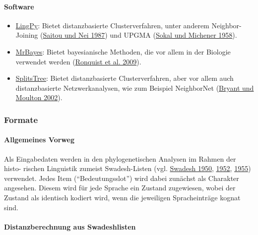 \paragraph{Software}

\begin{itemize}
\itemsep1pt\parskip0pt
\item
  \href{http://lingpy.org}{LingPy}: Bietet distanzbasierte
  Clusterverfahren, unter anderem Neighbor-Joining
  (\href{http://bibliography.lingpy.org?key=Saitou1987}{Saitou und Nei
  1987}) und UPGMA
  (\href{http://bibliography.lingpy.org?key=Sokal1958}{Sokal und
  Michener 1958}).
\item
  \href{http://mrbayes.sourceforge.net}{MrBayes}: Bietet bayesianische
  Methoden, die vor allem in der Biologie verwendet werden
  (\href{http://bibliography.lingpy.org?key=Ronquist2009}{Ronquist et
  al. 2009}).
\item
  \href{http://splitstree.org}{SplitsTree}: Bietet distanzbasierte
  Clusterverfahren, aber vor allem auch distanzbasierte
  Netzwerkanalysen, wie zum Beispiel NeighborNet
  (\href{http://bibliography.lingpy.org?key=Bryant2002}{Bryant und
  Moulton 2002}).
\end{itemize}



\subsubsection{Formate}

\paragraph{Allgemeines Vorweg}

Als Eingabedaten werden in den phylogenetischen Analysen im Rahmen der
histo- rischen Linguistik zumeist Swadesh-Listen (vgl.
\href{http://bibliography.lingpy.org?key=Swadesh1950}{Swadesh 1950},
\href{http://bibliography.lingpy.org?key=Swadesh1952}{1952},
\href{http://bibliography.lingpy.org?key=Swadesh1955}{1955}) verwendet.
Jedes Item (``Bedeutungsslot'') wird dabei zunächst als Charakter
angesehen. Diesem wird für jede Sprache ein Zustand zugewiesen, wobei
der Zustand als identisch kodiert wird, wenn die jeweiligen
Spracheinträge kognat sind.





\paragraph{Distanzberechnung aus Swadeshlisten}

